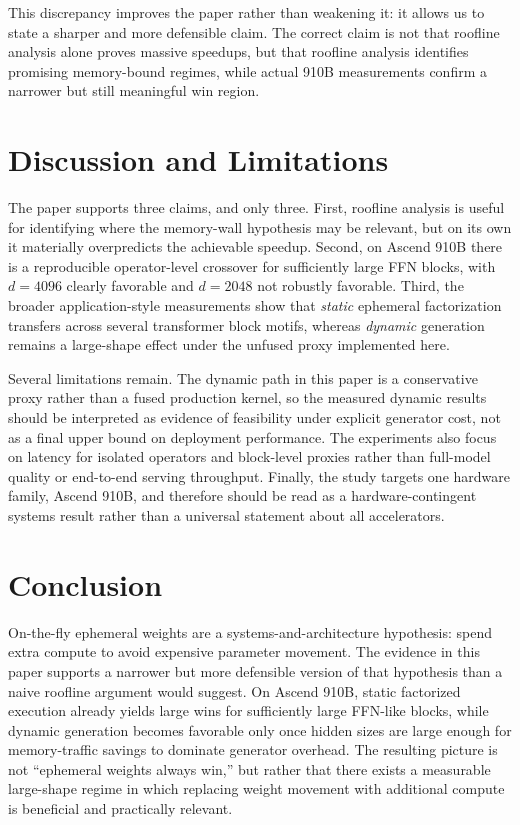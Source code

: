 \documentclass[11pt]{article}
\begin{document}
This discrepancy improves the paper rather than weakening it: it allows us to state a sharper and more defensible claim. The correct claim is not that roofline analysis alone proves massive speedups, but that roofline analysis identifies promising memory-bound regimes, while actual 910B measurements confirm a narrower but still meaningful win region.

\section{Discussion and Limitations}
The paper supports three claims, and only three. First, roofline analysis is useful for identifying where the memory-wall hypothesis may be relevant, but on its own it materially overpredicts the achievable speedup. Second, on Ascend 910B there is a reproducible operator-level crossover for sufficiently large FFN blocks, with $d=4096$ clearly favorable and $d=2048$ not robustly favorable. Third, the broader application-style measurements show that \emph{static} ephemeral factorization transfers across several transformer block motifs, whereas \emph{dynamic} generation remains a large-shape effect under the unfused proxy implemented here.

Several limitations remain. The dynamic path in this paper is a conservative proxy rather than a fused production kernel, so the measured dynamic results should be interpreted as evidence of feasibility under explicit generator cost, not as a final upper bound on deployment performance. The experiments also focus on latency for isolated operators and block-level proxies rather than full-model quality or end-to-end serving throughput. Finally, the study targets one hardware family, Ascend 910B, and therefore should be read as a hardware-contingent systems result rather than a universal statement about all accelerators.

\section{Conclusion}
On-the-fly ephemeral weights are a systems-and-architecture hypothesis: spend extra compute to avoid expensive parameter movement. The evidence in this paper supports a narrower but more defensible version of that hypothesis than a naive roofline argument would suggest. On Ascend 910B, static factorized execution already yields large wins for sufficiently large FFN-like blocks, while dynamic generation becomes favorable only once hidden sizes are large enough for memory-traffic savings to dominate generator overhead. The resulting picture is not ``ephemeral weights always win,'' but rather that there exists a measurable large-shape regime in which replacing weight movement with additional compute is beneficial and practically relevant.



\end{document}
